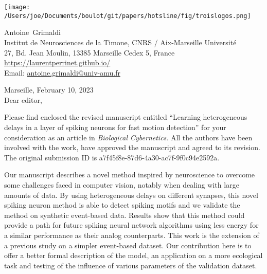 \documentclass[10pt,english]{article}
\makeatletter
\newcommand{\LastName}{Grimaldi}%
\newcommand{\FirstName}{Antoine}%
\newcommand{\Institute}{Institut de Neurosciences de la Timone, CNRS / Aix-Marseille Universit\'e}%
\newcommand{\Address}{27, Bd. Jean Moulin, 13385 Marseille Cedex 5, France}%
\newcommand{\Website}{\url{https://laurentperrinet.github.io/}}%
\newcommand{\Email}{\url{antoine.grimaldi@univ-amu.fr}}%
\makeatother
\begin{document}
\texttt{[image: /Users/joe/Documents/boulot/git/papers/hotsline/fig/troislogos.png]}
\\
\vspace{.1\baselineskip}
\hrulefill
\vspace{.1\baselineskip}

\begin{flushright}
	\FirstName\  \LastName\  \\
	\Institute\\[6pt]
	\Address\\%
	\Website \\
	  Email: \Email \\[6pt]
\end{flushright}
\justifying
\vspace{1\baselineskip}
Marseille, 
February 10, 2023%
\\[12pt] %
	
Dear editor,

Please find enclosed the revised manuscript entitled ``Learning heterogeneous delays in a layer of spiking neurons for fast motion detection'' for your consideration as an article in \emph{Biological Cybernetics}. All the authors have been involved with the work, have approved the manuscript and agreed to its revision. The original submission ID is a7f45f8e-87d6-4a30-ac7f-9f0c94e2592a. 

Our manuscript describes a novel method inspired by neuroscience to overcome some challenges faced in computer vision, notably when dealing with large amounts of data. By using heterogeneous delays on different synapses, this novel spiking neuron method is able to detect spiking motifs and we validate the method on synthetic event-based data. Results show that this method could provide a path for future spiking neural network algorithms using less energy for a similar performance as their analog counterparts. This work is the extension of a previous study on a simpler event-based dataset. Our contribution here is to offer a better formal description of the model, an application on a more ecological task and testing of the influence of various parameters of the validation dataset.
\end{document}
